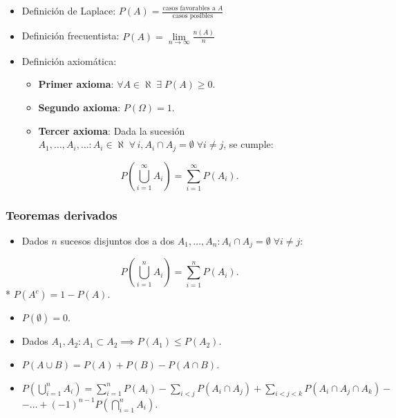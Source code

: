 \documentclass[
]{article}
\providecommand{\tightlist}{%
  \setlength{\itemsep}{0pt}\setlength{\parskip}{0pt}}
\begin{document}
\begin{itemize}
\item
  Definición de Laplace:
  \(P(A) = \frac{\text{casos favorables a } A}{\text{casos posibles}}\)
\item
  Definición frecuentista:
  \(P(A) = \lim\limits_{n \to \infty} \frac{n(A)}{n}\)
\item
  Definición axiomática:

  \begin{itemize}
  \tightlist
  \item
    \textbf{Primer axioma}:
    \(\forall A \in \aleph \; \exists \; P(A) \geq 0\).
  \item
    \textbf{Segundo axioma}: \(P(\Omega) = 1\).
  \item
    \textbf{Tercer axioma}: Dada la sucesión
    \(A_1, \ldots, A_i, \ldots: A_i \in \aleph \; \forall\, i, A_i \cap A_j = \emptyset \; \forall i \neq j\),
    se cumple:
  \end{itemize}
\end{itemize}

\[P \left (\bigcup\limits_{i=1}^{\infty} A_i \right ) = \sum\limits_{i=1}^{\infty} P(A_i).\]

\hypertarget{teoremas-derivados}{%
\subsubsection{Teoremas derivados}\label{teoremas-derivados}}

\begin{itemize}
\tightlist
\item
  Dados \(n\) sucesos disjuntos dos a dos
  \(A_1, \ldots, A_n: A_i \cap A_j = \emptyset \; \forall i \neq j\):
\end{itemize}

\[P \left (\bigcup\limits_{i=1}^{n} A_i \right ) = \sum\limits_{i=1}^{n} P(A_i).\]
* \(P(A^c)=1-P(A)\).

\begin{itemize}
\item
  \(P(\emptyset) = 0\).
\item
  Dados \(A_1, A_2: A_1 \subset A_2 \implies P(A_1) \leq P(A_2)\).
\item
  \(P(A \cup B) = P(A) + P(B) - P(A \cap B)\).
\item
  \(P(\bigcup\limits_{i=1}^n A_i) = \sum\limits_{i=1}^n P(A_i) - \sum\limits_{i<j} P(A_i \cap A_j) + \sum\limits_{i<j<k} P(A_i \cap A_j \cap A_k) -\)\\
  \(- \ldots + (-1)^{n-1} P \left(\bigcap\limits_{i=1}^n A_i\right ).\)
\end{itemize}
\end{document}
